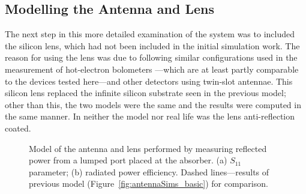 \subsection{Modelling the Antenna and Lens}\label{ssec:antennaSims_Lens}
The next step in this more detailed examination of the system was to included the silicon lens, which had not been included in the initial simulation work. The reason for using the lens was due to following similar configurations used in the measurement of hot-electron bolometers ---which are at least partly comparable to the devices tested here---and other detectors using twin-slot antennae\parencite[see for example:][along with other works by Karasik on this topic]{Ganzevles2000,Focardi2005,Karasik2011}. This silicon lens replaced the infinite silicon substrate seen in the previous model; other than this, the two models were the same and the results were computed in the same manner. In neither the model nor real life was the lens anti-reflection coated.
\begin{figure}[tb]
\begin{center}
\caption[Model of the antenna and lens performed by measuring reflected power]{Model of the antenna and lens performed by measuring reflected power from a lumped port placed at the absorber. (a) $S_{11}$ parameter; (b) radiated power efficiency. Dashed lines---results of previous model (Figure~\ref{fig:antennaSims_basic}) for comparison.}
\label{fig:antennaSims_lens}
\end{center}
\end{figure}
